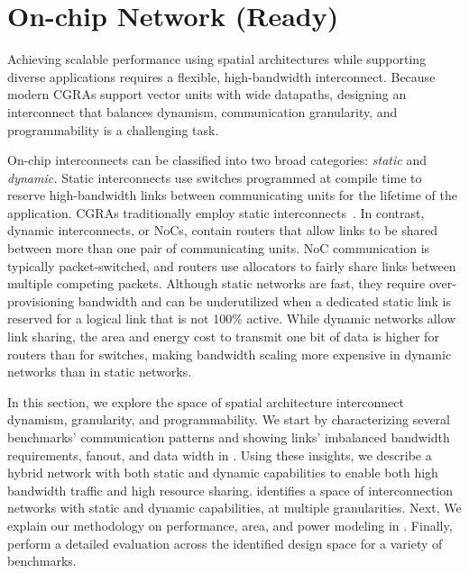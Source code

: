 \section{On-chip Network (Ready)}

Achieving scalable performance using spatial architectures while supporting diverse applications requires a flexible, high-bandwidth interconnect.
 Because modern CGRAs support vector units with wide datapaths, designing an interconnect that balances dynamism, communication granularity, and programmability is a challenging task.

On-chip interconnects can be classified into two broad categories: \emph{static} and \emph{dynamic.}
 {Static interconnects} use switches programmed at compile time to reserve high-bandwidth links between communicating units for the lifetime of the application.
CGRAs traditionally employ static interconnects~\cite{cgraSurvey1, cgraSurvey2}.
In contrast, {dynamic interconnects}, or NoCs, contain routers that allow links to be shared between more than one pair of communicating units.
NoC communication is typically packet-switched, and routers use allocators to fairly share links between multiple competing packets.
Although static networks are fast, they require over-provisioning bandwidth and can be underutilized when a dedicated static link is reserved for a logical link that is not 100\% active. 
While dynamic networks allow link sharing, the area and energy cost to transmit one bit of data is higher for routers than for switches, making bandwidth scaling more expensive in dynamic networks than in static networks.

In this section, we explore the space of spatial architecture interconnect dynamism, granularity, and programmability.
We start by characterizing several benchmarks' communication patterns and showing links' imbalanced
bandwidth requirements, fanout, and data width in . 
Using these insights, we describe a hybrid network with both static and dynamic capabilities to enable both high bandwidth traffic and high resource sharing.
 identifies a space of interconnection networks with static and dynamic capabilities, at multiple granularities. 
Next, We explain our methodology on performance, area, and power modeling in .
Finally,  perform a detailed evaluation across the identified design space for a variety of benchmarks.

